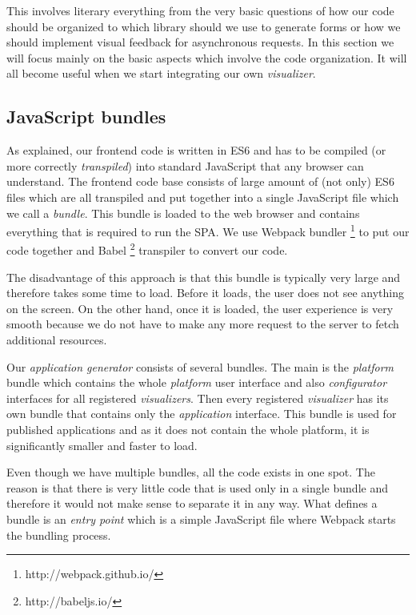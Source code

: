 This involves literary everything from the very basic questions of how our code should be organized to which library should we use to generate forms or how we should implement visual feedback for asynchronous requests. In this section we will focus mainly on the basic aspects which involve the code organization. It will all become useful when we start integrating our own \emph{visualizer}.

\subsection{JavaScript bundles}

As explained, our frontend code is written in ES6 and has to be compiled (or more correctly \emph{transpiled}) into standard JavaScript that any browser can understand. The frontend code base consists of large amount of (not only) ES6 files which are all transpiled and put together into a single JavaScript file which we call a \emph{bundle}. This bundle is loaded to the web browser and contains everything that is required to run the SPA. We use Webpack bundler \footnote{http://webpack.github.io/} to put our code together and Babel \footnote{http://babeljs.io/} transpiler to convert our code.

The disadvantage of this approach is that this bundle is typically very large and therefore takes some time to load. Before it loads, the user does not see anything on the screen. On the other hand, once it is loaded, the user experience is very smooth because we do not have to make any more request to the server to fetch additional resources.

Our \emph{application generator} consists of several bundles. The main is the \emph{platform} bundle which contains the whole \emph{platform} user interface and also \emph{configurator} interfaces for all registered \emph{visualizers}. Then every registered \emph{visualizer} has its own bundle that contains only the \emph{application} interface. This bundle is used for published applications and as it does not contain the whole platform, it is significantly smaller and faster to load.

Even though we have multiple bundles, all the code exists in one spot. The reason is that there is very little code that is used only in a single bundle and therefore it would not make sense to separate it in any way. What defines a bundle is an \emph{entry point} which is a simple JavaScript file where Webpack starts the bundling process.

